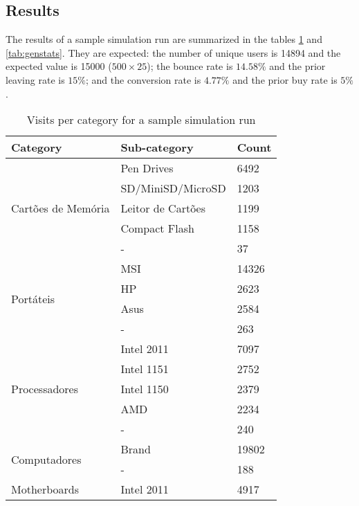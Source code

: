 \subsection{Results}

The results of a sample simulation run are summarized in the tables 
\ref{tab:visitscat} and \ref{tab:genstats}. They are expected: the number of 
unique users is 14894 and the expected value is 15000 ($500 \times 25$); the 
bounce rate is $14.58\%$ and the prior leaving rate is $15\%$; and the 
conversion rate is $4.77\%$ and the prior buy rate is $5\%$.

\begin{table}[h]
    \centering
    \caption{Visits per category for a sample simulation run}
    \label{tab:visitscat}
    \begin{tabular}{@{}lll@{}}
        \toprule
        \textbf{Category}                   & \textbf{Sub-category} & 
        \textbf{Count} \\ \midrule
        \multirow{5}{*}{Cartões de Memória} & Pen Drives            & 
        6492           \\
        & SD/MiniSD/MicroSD     & 1203           \\
        & Leitor de Cartões     & 1199           \\
        & Compact Flash         & 1158           \\
        & -                     & 37             \\ \midrule
        \multirow{4}{*}{Portáteis}          & MSI                   & 
        14326          \\
        & HP                    & 2623           \\
        & Asus                  & 2584           \\
        & -                     & 263            \\ \midrule
        \multirow{5}{*}{Processadores}      & Intel 2011            & 
        7097           \\
        & Intel 1151            & 2752           \\
        & Intel 1150            & 2379           \\
        & AMD                   & 2234           \\
        & -                     & 240            \\ \midrule
        \multirow{2}{*}{Computadores}       & Brand                 & 
        19802          \\
        & -                     & 188            \\ \midrule
        Motherboards                        & Intel 2011            & 
        4917           \\ \bottomrule
    \end{tabular}
\end{table}

